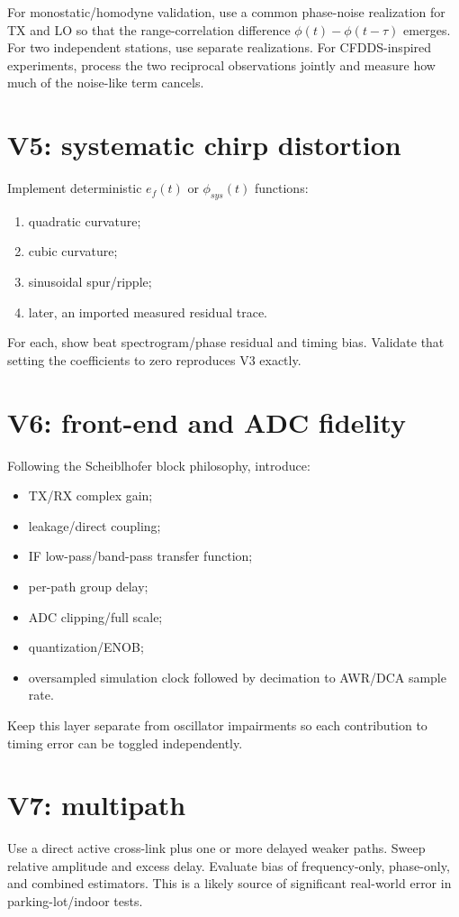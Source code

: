 \documentclass[11pt]{article}
\begin{document}
For monostatic/homodyne validation, use a common phase-noise realization for TX and LO so that the range-correlation difference $\phi(t)-\phi(t-\tau)$ emerges. For two independent stations, use separate realizations. For CFDDS-inspired experiments, process the two reciprocal observations jointly and measure how much of the noise-like term cancels.

\section{V5: systematic chirp distortion}
Implement deterministic $e_f(t)$ or $\phi_{sys}(t)$ functions:
\begin{enumerate}
\item quadratic curvature;
\item cubic curvature;
\item sinusoidal spur/ripple;
\item later, an imported measured residual trace.
\end{enumerate}
For each, show beat spectrogram/phase residual and timing bias. Validate that setting the coefficients to zero reproduces V3 exactly.

\section{V6: front-end and ADC fidelity}
Following the Scheiblhofer block philosophy, introduce:
\begin{itemize}
\item TX/RX complex gain;
\item leakage/direct coupling;
\item IF low-pass/band-pass transfer function;
\item per-path group delay;
\item ADC clipping/full scale;
\item quantization/ENOB;
\item oversampled simulation clock followed by decimation to AWR/DCA sample rate.
\end{itemize}
Keep this layer separate from oscillator impairments so each contribution to timing error can be toggled independently.

\section{V7: multipath}
Use a direct active cross-link plus one or more delayed weaker paths. Sweep relative amplitude and excess delay. Evaluate bias of frequency-only, phase-only, and combined estimators. This is a likely source of significant real-world error in parking-lot/indoor tests.
\end{document}
